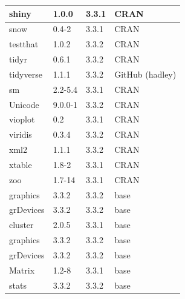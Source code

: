 \begin{longtable}{@{\extracolsep{\fill}}|llll|@{}}
shiny        & 1.0.0          & 3.3.1 & CRAN            \\ \hline
snow         & 0.4-2          & 3.3.1 & CRAN            \\ \hline
testthat     & 1.0.2          & 3.3.2 & CRAN            \\ \hline
tidyr        & 0.6.1          & 3.3.2 & CRAN            \\ \hline
tidyverse    & 1.1.1          & 3.3.2 & GitHub (hadley) \\ \hline
sm           & 2.2-5.4        & 3.3.1 & CRAN            \\ \hline
Unicode      & 9.0.0-1        & 3.3.2 & CRAN            \\ \hline
vioplot      & 0.2            & 3.3.1 & CRAN            \\ \hline
viridis      & 0.3.4          & 3.3.2 & CRAN            \\ \hline
xml2         & 1.1.1          & 3.3.2 & CRAN            \\ \hline
xtable       & 1.8-2          & 3.3.1 & CRAN            \\ \hline
zoo          & 1.7-14         & 3.3.1 & CRAN            \\ \hline
graphics     & 3.3.2          & 3.3.2 & base            \\ \hline
grDevices    & 3.3.2          & 3.3.2 & base            \\ \hline
cluster      & 2.0.5          & 3.3.1 & base            \\ \hline
graphics     & 3.3.2          & 3.3.2 & base            \\ \hline
grDevices    & 3.3.2          & 3.3.2 & base            \\ \hline
Matrix       & 1.2-8          & 3.3.1 & base            \\ \hline
stats        & 3.3.2          & 3.3.2 & base            \\ \hline
\end{longtable}

